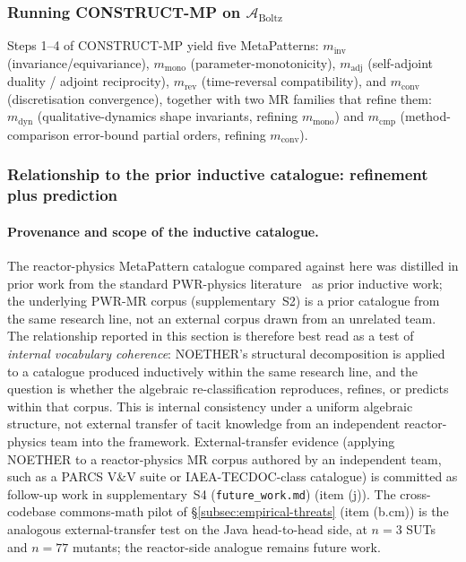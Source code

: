 \documentclass[acmsmall,screen,review]{acmart}
\begin{document}
\subsubsection{Running CONSTRUCT-MP on \texorpdfstring{$\mathcal{A}_{\mathrm{Boltz}}$}{A\_Boltz}}

Steps 1--4 of CONSTRUCT-MP yield five MetaPatterns: $m_{\mathrm{inv}}$ (invariance/equivariance), $m_{\mathrm{mono}}$ (parameter-monotonicity), $m_{\mathrm{adj}}$ (self-adjoint duality / adjoint reciprocity), $m_{\mathrm{rev}}$ (time-reversal compatibility), and $m_{\mathrm{conv}}$ (discretisation convergence), together with two MR families that refine them: $m_{\mathrm{dyn}}$ (qualitative-dynamics shape invariants, refining $m_{\mathrm{mono}}$) and $m_{\mathrm{cmp}}$ (method-comparison error-bound partial orders, refining $m_{\mathrm{conv}}$).

\subsubsection{Relationship to the prior inductive catalogue: refinement plus prediction}
\label{subsec:reactor-mapping}

\paragraph{Provenance and scope of the inductive catalogue.}
The reactor-physics MetaPattern catalogue compared against here was distilled in prior work from the standard PWR-physics literature~\cite{BellGlasstone1970, LewisMiller1993} as prior inductive work; the underlying PWR-MR corpus (supplementary~S2) is a prior catalogue from the same research line, not an external corpus drawn from an unrelated team. The relationship reported in this section is therefore best read as a test of \emph{internal vocabulary coherence}: NOETHER's structural decomposition is applied to a catalogue produced inductively within the same research line, and the question is whether the algebraic re-classification reproduces, refines, or predicts within that corpus. This is internal consistency under a uniform algebraic structure, not external transfer of tacit knowledge from an independent reactor-physics team into the framework. External-transfer evidence (applying NOETHER to a reactor-physics MR corpus authored by an independent team, such as a PARCS V\&V suite or IAEA-TECDOC-class catalogue) is committed as follow-up work in supplementary~S4 (\texttt{future\_work.md}) (item (j)). The cross-codebase commons-math pilot of \S\ref{subsec:empirical-threats} (item (b.cm)) is the analogous external-transfer test on the Java head-to-head side, at $n = 3$ SUTs and $n = 77$ mutants; the reactor-side analogue remains future work.
\end{document}
